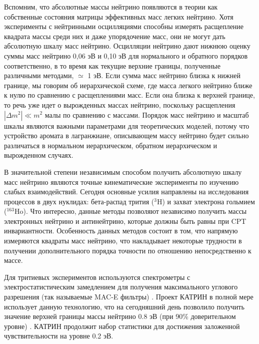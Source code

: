 \documentclass[a4paper,14pt]{extarticle}
\begin{document}
    Вспомним, что абсолютные массы нейтрино появляются в теории как собственные состояния матрицы 
    эффективных масс легких нейтрино. Хотя эксперименты с нейтринными осцилляциями способны измерять 
    расщепление квадрата массы среди них и даже упорядочение масс, они не могут дать абсолютную 
    шкалу масс нейтрино. Осцилляции нейтрино дают нижнюю оценку суммы масс нейтрино 0,06 эВ и 0,10 эВ 
    для нормального и обратного порядков соответственно, в то время как текущие верхние границы, полученные 
    различными методами, $\simeq$ 1 эВ. Если сумма масс нейтрино близка к нижней границе, мы говорим 
    об иерархической схеме, где масса легкого нейтрино ближе к нулю по сравнению с расщеплениями масс. 
    Если она близка к верхней границе, то речь уже идет о вырожденных массах нейтрино, поскольку расщепления 
    $|\Delta m^2| \ll m^2 $ малы по сравнению с массами. Порядок масс нейтрино и масштаб шкалы являются
    важными параметрами для теоретических моделей, потому что устройство аромата в лагранжиане, описывающем 
    массу нейтрино будет сильно различаться в нормальном иерархическом, обратном иерархическом и вырожденном случаях. 
    
    В значительной степени независимым способом получить абсолютную шкалу масс нейтрино 
    являются точные кинематические эксперименты по изучению слабых взаимодействий. Сегодня 
    основные усилия направлены на исследования процессов в двух нуклидах: бета-распад трития ($^{3}$H) и 
    захват электрона гольмием ($^{163}$Ho). Что интересно, данные методы позволяют независимо 
    получить массы электронных нейтрино и антинейтрино, которые должны быть равны при CPT 
    инвариантности. Особенность данных методов состоит в том, что напрямую измеряются квадраты
    масс нейтрино, что накладывает некоторые трудности в получении дополнительного порядка
    точности по отношению непосредственно к массе. 
    
    Для тритиевых экспериментов используются спектрометры с электростатистическим замедлением
    для получения максимального углового разрешения (так называемые MAC-E фильтры) \cite{lobashev} \cite{picard}.
    Проект КАТРИН в полной мере использует данную технологию, что на сегодняшний день позволило
    получить значение верхней границы массы нейтрино 0.8 эВ (при 90\% доверительном уровне) \cite{aker}.
    КАТРИН продолжит набор статистики для достижения заложенной чувствительности на уровне
    0.2 эВ.
     

\end{document}
